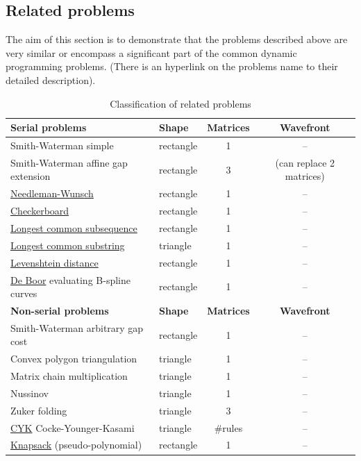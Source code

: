 \newpage
\subsection{Related problems}
The aim of this section is to demonstrate that the problems described above are very similar or encompass a significant part of the common dynamic programming problems. (There is an hyperlink on the problems name to their detailed description).

\begin{table}[H]\begin{center}\begin{tabular}{llcc} \toprule
\bf Serial problems & \bf Shape & \bf Matrices & \bf Wavefront \\ \midrule
Smith-Waterman \footnotesize simple & rectangle & 1 & -- \\
Smith-Waterman \footnotesize affine gap extension & rectangle & 3 & (can replace 2 matrices) \\
\href{http://en.wikipedia.org/wiki/Needleman-Wunsch_algorithm}{Needleman-Wunsch} & rectangle & 1 & -- \\
\href{http://en.wikipedia.org/wiki/Dynamic_programming#Checkerboard}{Checkerboard} & rectangle & 1 & -- \\
\href{http://en.wikipedia.org/wiki/Longest_common_subsequence_problem\#Code_for_the_dynamic_programming_solution}{Longest common subsequence} & rectangle & 1 & -- \\
\href{http://en.wikipedia.org/wiki/Longest_common_substring_problem\#Pseudocode}{Longest common substring} & triangle & 1 & -- \\
\href{http://en.wikipedia.org/wiki/Levenshtein_distance\#Computing_Levenshtein_distance}{Levenshtein distance} & rectangle & 1 & -- \\
\href{http://en.wikipedia.org/wiki/De_Boor's_algorithm}{De Boor} \footnotesize evaluating B-spline curves & rectangle & 1 & -- \vspace{.4cm} \\
\toprule
\bf Non-serial problems & \bf Shape & \bf Matrices & \bf Wavefront \\ \midrule
Smith-Waterman \footnotesize arbitrary gap cost & rectangle & 1 & -- \\
Convex polygon triangulation & triangle & 1 & -- \\
Matrix chain multiplication & triangle & 1 & -- \\
Nussinov & triangle & 1 & -- \\
Zuker folding & triangle & 3 & -- \\
\href{http://en.wikipedia.org/wiki/CYK_algorithm}{CYK} \footnotesize Cocke-Younger-Kasami & triangle & \#rules & -- \\
\href{http://en.wikipedia.org/wiki/Knapsack_problem#Dynamic_programming}{Knapsack} \footnotesize (pseudo-polynomial) & rectangle & 1 & --\\
\end{tabular}\end{center}
\caption{Classification of related problems}
\end{table}

